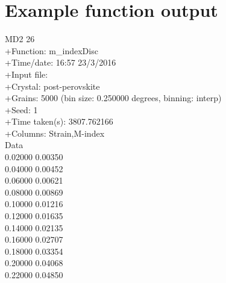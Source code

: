 \documentclass[a4paper,12pt,twoside]{report}
\numberwithin{equation}{chapter}
\begin{document}
\section{Example function output} \label{App:example_output}
\begin{texttt}
MD2\hspace{1cm}	     26\\
+Function:\hspace{1cm}      m\_indexDisc\\
+Time/date:\hspace{1cm}     16:57 23/3/2016\\
+Input file:\\    
+Crystal:\hspace{1cm}       post-perovskite\\
+Grains:\hspace{1cm}        5000 (bin size: 0.250000 degrees, binning: interp)\\
+Seed:\hspace{1cm}          1\\
+Time taken(s):\hspace{1cm} 3807.762166\\
+Columns:\hspace{1cm}       Strain,M-index\\
Data\\
   0.02000\hspace{1cm}    0.00350 \\
   0.04000\hspace{1cm}    0.00452 \\
   0.06000\hspace{1cm}    0.00621 \\
   0.08000\hspace{1cm}    0.00869 \\
   0.10000\hspace{1cm}    0.01216 \\
   0.12000\hspace{1cm}    0.01635 \\
   0.14000\hspace{1cm}    0.02135 \\
   0.16000\hspace{1cm}    0.02707 \\
   0.18000\hspace{1cm}    0.03354 \\
   0.20000\hspace{1cm}    0.04068 \\
   0.22000\hspace{1cm}    0.04850 \\

\end{texttt}
\end{document}
